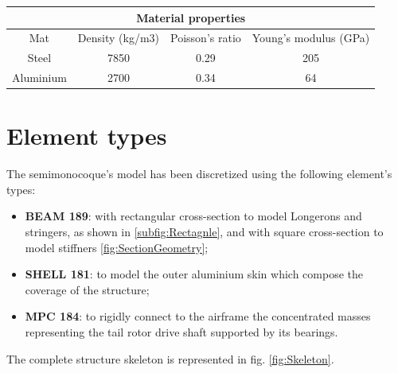 \begin{table}[h!]
	\centering
	
	\begin{tabular}{c c c c} 
		\toprule
		\multicolumn{4}{c}{Material properties}\\
		\midrule
		Mat & Density (kg/m3) & Poisson's ratio & Young's modulus (GPa) \\
		\midrule
		Steel & 7850  &  0.29 & 205 \\ 
		\midrule
		Aluminium & 2700  &  0.34 & 64 \\
		\bottomrule
	\end{tabular}	
\end{table}

\clearpage
\section*{Element types}
\noindent
The semimonocoque's model has been discretized using the following element's types:
\begin{itemize}
	\item \textbf{BEAM 189}: with rectangular cross-section to model Longerons and stringers, as shown in \ref{subfig:Rectagnle}, and with square cross-section to model stiffners \ref{fig:SectionGeometry};
	\item \textbf{SHELL 181}: to model the outer aluminium skin which compose the coverage of the structure;
	\item \textbf{MPC 184}: to rigidly connect to the airframe the concentrated masses representing the tail rotor drive shaft supported by its bearings.
\end{itemize}
%
The complete structure skeleton is represented in fig. \ref{fig:Skeleton}.
%
\bigskip
